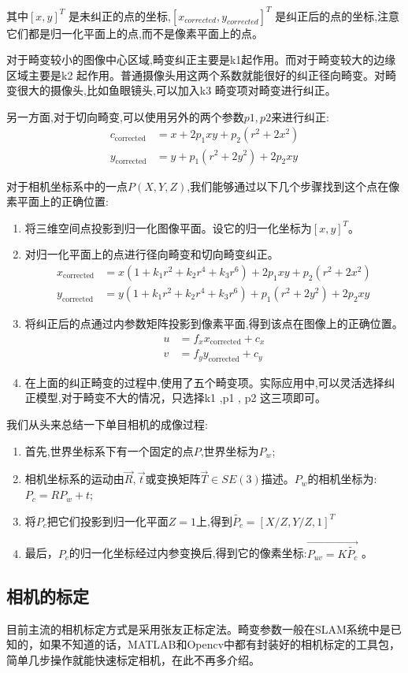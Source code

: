 其中$[x,y]^T$ 是未纠正的点的坐标,$[x_{corrected},y_{corrected}]^T$ 是纠正后的点的坐标,注意它们都是归一化平面上的点,而不是像素平面上的点。\par
对于畸变较小的图像中心区域,畸变纠正主要是k1起作用。而对于畸变较大的边缘区域主要是k2 起作用。普通摄像头用这两个系数就能很好的纠正径向畸变。对畸变很大的摄像头,比如鱼眼镜头,可以加入k3 畸变项对畸变进行纠正。\par
另一方面,对于切向畸变,可以使用另外的两个参数$p1 ,p2$来进行纠正:
\begin{equation}
\begin{aligned} c_{\text {corrected}} &=x+2 p_{1} x y+p_{2}\left(r^{2}+2 x^{2}\right) \\ y_{\text {corrected}} &=y+p_{1}\left(r^{2}+2 y^{2}\right)+2 p_{2} x y \end{aligned}
\end{equation}\par
对于相机坐标系中的一点$P(X,Y,Z)$,我们能够通过以下几个步骤找到这个点在像素平面上的正确位置:\par
\begin{enumerate}
\item 将三维空间点投影到归一化图像平面。设它的归一化坐标为$[x,y]^T$。
\item 对归一化平面上的点进行径向畸变和切向畸变纠正。
\begin{equation}
\begin{aligned} x_{\text {corrected}} &=x\left(1+k_{1} r^{2}+k_{2} r^{4}+k_{3} r^{6}\right)+2 p_{1} x y+p_{2}\left(r^{2}+2 x^{2}\right) \\ y_{\text {corrected}} &=y\left(1+k_{1} r^{2}+k_{2} r^{4}+k_{3} r^{6}\right)+p_{1}\left(r^{2}+2 y^{2}\right)+2 p_{2} x y \end{aligned}
\end{equation}
\item 将纠正后的点通过内参数矩阵投影到像素平面,得到该点在图像上的正确位置。
\begin{equation}
\begin{aligned} u &=f_{x} x_{\text {corrected}}+c_{x} \\ v &=f_{y} y_{\text {corrected}}+c_{y} \end{aligned}
\end{equation}
\item 在上面的纠正畸变的过程中,使用了五个畸变项。实际应用中,可以灵活选择纠正模型,对于畸变不大的情况，只选择k1 ,p1 , p2 这三项即可。
\end{enumerate}
我们从头来总结一下单目相机的成像过程:
\begin{enumerate}
\item 首先,世界坐标系下有一个固定的点$P$,世界坐标为$P_w$;
\item 相机坐标系的运动由$\vec{R},\vec{t}$或变换矩阵$\vec{T} \in SE(3)$描述。$P_w$的相机坐标为:$P_{c}=R P_{w}+t$;
\item 将$P_c$把它们投影到归一化平面$Z=1$上,得到$\tilde{P_c}=[X / Z, Y / Z, 1]^{T}$
\item 最后，$P_c$的归一化坐标经过内参变换后,得到它的像素坐标:$\vec{P_{uv}=K\tilde{P_c}}$ 。
\end{enumerate}\par
\subsection{相机的标定}
目前主流的相机标定方式是采用张友正标定法\cite{zhang1999flexible}。畸变参数一般在SLAM系统中是已知的，如果不知道的话，MATLAB和Opencv中都有封装好的相机标定的工具包，简单几步操作就能快速标定相机，在此不再多介绍。